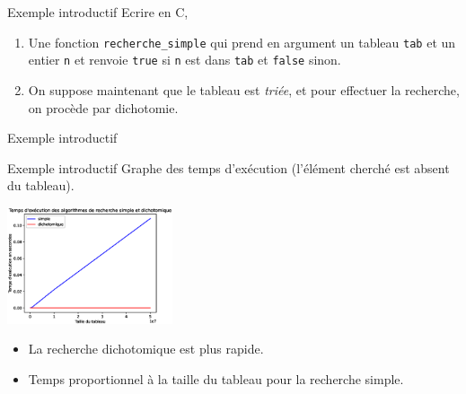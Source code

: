 \documentclass[10pt]{beamer}
\begin{document}
\begin{frame}[fragile]{\Ctitle}{\stitle}
    \begin{exampleblock}{Exemple introductif}
        Ecrire en C,
        \begin{enumerate}
            \item<2-> Une fonction {\tt recherche\_simple} qui prend en argument un tableau {\tt tab} et un entier {\tt n} et renvoie {\tt true} si {\tt n} est dans {\tt tab} et {\tt false} sinon. \\
            \item<4-> On suppose maintenant que le tableau est \textit{triée}, et pour effectuer la recherche, on procède par dichotomie.  
        \end{enumerate}
    \end{exampleblock}
\end{frame}

\begin{frame}[fragile]{\Ctitle}{\stitle}
    \begin{exampleblock}{Exemple introductif}
    \end{exampleblock}
\end{frame}

\begin{frame}[fragile]{\Ctitle}{\stitle}
    \begin{exampleblock}{Exemple introductif}
        Graphe des temps d'exécution (l'élément cherché est absent du tableau).
        \begin{center}
            \includegraphics[height=130px]{recherche.eps}
        \end{center}
        \begin{itemize}
            \item<2-> La recherche dichotomique est plus rapide.
            \item<3-> Temps proportionnel à la taille du tableau pour la recherche simple.
        \end{itemize}
    \end{exampleblock}
\end{frame}
\end{document}
